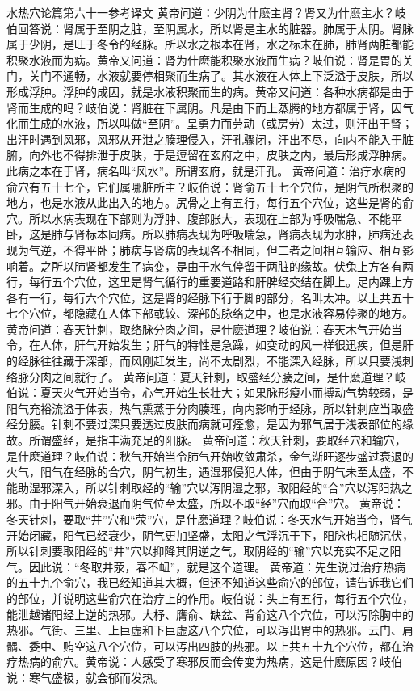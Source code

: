 \documentclass[a4paper,12pt,UTF8,twoside]{ctexbook}
\begin{document}
水热穴论篇第六十一参考译文
黄帝问道：少阴为什麽主肾？肾又为什麽主水？岐伯回答说：肾属于至阴之脏，至阴属水，所以肾是主水的脏器。肺属于太阴。肾脉属于少阴，是旺于冬令的经脉。所以水之根本在肾，水之标末在肺，肺肾两脏都能积聚水液而为病。黄帝又问道：肾为什麽能积聚水液而生病？岐伯说：肾是胃的关门，关门不通畅，水液就要停相聚而生病了。其水液在人体上下泛溢于皮肤，所以形成浮肿。浮肿的成因，就是水液积聚而生的病。黄帝又问道：各种水病都是由于肾而生成的吗？岐伯说：肾脏在下属阴。凡是由下而上蒸腾的地方都属于肾，因气化而生成的水液，所以叫做“至阴”。呈勇力而劳动（或房劳）太过，则汗出于肾；出汗时遇到风邪，风邪从开泄之腠理侵入，汗孔骤闭，汗出不尽，向内不能入于脏腑，向外也不得排泄于皮肤，于是逗留在玄府之中，皮肤之内，最后形成浮肿病。此病之本在于肾，病名叫“风水”。所谓玄府，就是汗孔。
黄帝问道：治疗水病的俞穴有五十七个，它们属哪脏所主？岐伯说：肾俞五十七个穴位，是阴气所积聚的地方，也是水液从此出入的地方。尻骨之上有五行，每行五个穴位，这些是肾的俞穴。所以水病表现在下部则为浮肿、腹部胀大，表现在上部为呼吸喘急、不能平卧，这是肺与肾标本同病。所以肺病表现为呼吸喘急，肾病表现为水肿，肺病还表现为气逆，不得平卧；肺病与肾病的表现各不相同，但二者之间相互输应、相互影响着。之所以肺肾都发生了病变，是由于水气停留于两脏的缘故。伏兔上方各有两行，每行五个穴位，这里是肾气循行的重要道路和肝脾经交结在脚上。足内踝上方各有一行，每行六个穴位，这是肾的经脉下行于脚的部分，名叫太冲。以上共五十七个穴位，都隐藏在人体下部或较、深部的脉络之中，也是水液容易停聚的地方。
黄帝问道：春天针刺，取络脉分肉之间，是什麽道理？岐伯说：春天木气开始当令，在人体，肝气开始发生；肝气的特性是急躁，如变动的风一样很迅疾，但是肝的经脉往往藏于深部，而风刚赶发生，尚不太剧烈，不能深入经脉，所以只要浅刺络脉分肉之间就行了。
黄帝问道：夏天针刺，取盛经分腠之间，是什麽道理？岐伯说：夏天火气开始当令，心气开始生长壮大；如果脉形瘦小而搏动气势较弱，是阳气充裕流溢于体表，热气熏蒸于分肉腠理，向内影响于经脉，所以针刺应当取盛经分腠。针刺不要过深只要透过皮肤而病就可痊愈，是因为邪气居于浅表部位的缘故。所谓盛经，是指丰满充足的阳脉。
黄帝问道：秋天针刺，要取经穴和输穴，是什麽道理？岐伯说：秋气开始当令肺气开始收敛肃杀，金气渐旺逐步盛过衰退的火气，阳气在经脉的合穴，阴气初生，遇湿邪侵犯人体，但由于阴气未至太盛，不能助湿邪深入，所以针刺取经的“输”穴以泻阴湿之邪，取阳经的“合”穴以泻阳热之邪。由于阳气开始衰退而阴气位至太盛，所以不取“经”穴而取“合”穴。
黄帝说：冬天针刺，要取“井”穴和“荥”穴，是什麽道理？岐伯说：冬天水气开始当令，肾气开始闭藏，阳气已经衰少，阴气更加坚盛，太阳之气浮沉于下，阳脉也相随沉伏，所以针刺要取阳经的“井”穴以抑降其阴逆之气，取阴经的“输”穴以充实不足之阳气。因此说：“冬取井荥，春不衄”，就是这个道理。
黄帝道：先生说过治疗热病的五十九个俞穴，我已经知道其大概，但还不知道这些俞穴的部位，请告诉我它们的部位，并说明这些俞穴在治疗上的作用。岐伯说：头上有五行，每行五个穴位，能泄越诸阳经上逆的热邪。大杼、膺俞、缺盆、背俞这八个穴位，可以泻除胸中的热邪。气街、三里、上巨虚和下巨虚这八个穴位，可以泻出胃中的热邪。云门、肩髃、委中、贿空这八个穴位，可以泻出四肢的热邪。以上共五十九个穴位，都在治疗热病的俞穴。黄帝说：人感受了寒邪反而会传变为热病，这是什麽原因？岐伯说：寒气盛极，就会郁而发热。
\end{document}
